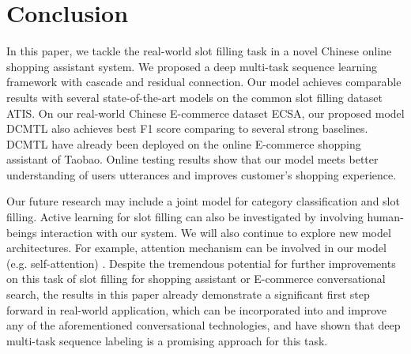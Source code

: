 \section{Conclusion}
\label{sec:conclusion}
In this paper, we tackle the real-world slot filling task 
in a novel Chinese online shopping assistant system. 
We proposed a deep multi-task sequence learning framework with 
cascade and residual connection. 
Our model achieves comparable results with 
several state-of-the-art models on the common slot filling dataset ATIS. 
On our real-world Chinese E-commerce dataset ECSA, 
our proposed model DCMTL also achieves best F1 score comparing 
to several strong baselines.
DCMTL have already been deployed on the online E-commerce shopping assistant of Taobao.
Online testing results show that our model meets better understanding of users utterances
and improves customer’s shopping experience.

Our future research may include a joint model for category classification 
and slot filling.
Active learning for slot filling can also be investigated by involving human-beings interaction with our system.
We will also continue to explore new model architectures.
For example, attention mechanism can be involved in our model (e.g. self-attention) \cite{tan2017deep,vaswani2017attention}.
Despite the tremendous potential for further improvements on
this task of slot filling for shopping assistant or
E-commerce conversational search,
the results in this paper already demonstrate a significant
first step forward in real-world application,
which can be incorporated into and improve
any of the aforementioned conversational technologies,
and have shown that deep multi-task sequence labeling
is a promising approach for this task.

